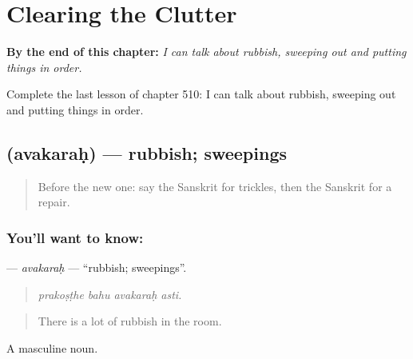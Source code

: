 
\chapter{Clearing the Clutter}
\label{ch:sa-clearing-the-clutter}

\begin{chapteropening}
\textbf{By the end of this chapter:} \emph{I can talk about rubbish, sweeping out and putting things in order.}

Complete the last lesson of chapter 510: I can talk about rubbish, sweeping out and putting things in order.
\end{chapteropening}

\section[\texorpdfstring{\sk{अवकरः} (avakaraḥ)}{अवकरः (avakaraḥ)}]{ (avakaraḥ) — rubbish; sweepings}

\label{lesson:SA-C510-avakarah}



\begin{quote}
Before the new one: say the Sanskrit for trickles, then the Sanskrit for a repair.
\end{quote}

\subsection*{You'll want to know: }
\textbf{} — \emph{avakaraḥ} — \textquotedblleft{}rubbish; sweepings\textquotedblright{}.

\begin{quote}
   
\end{quote}

\begin{quote}
\emph{prakoṣṭhe bahu avakaraḥ asti.}
\end{quote}

\begin{quote}
There is a lot of rubbish in the room.
\end{quote}

A masculine noun.

